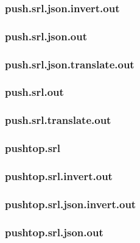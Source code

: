 \subsubsection{push.srl.json.invert.out}
\label{app:push_srl.json.invert.out}

\subsubsection{push.srl.json.out}
\label{app:push_srl.json.out}

\subsubsection{push.srl.json.translate.out}
\label{app:push_srl.json.translate.out}

\subsubsection{push.srl.out}
\label{app:push_srl.out}

\subsubsection{push.srl.translate.out}
\label{app:push_srl.translate.out}

\subsubsection{pushtop.srl}
\label{app:pushtop_srl}

\subsubsection{pushtop.srl.invert.out}
\label{app:pushtop_srl.invert.out}

\subsubsection{pushtop.srl.json.invert.out}
\label{app:pushtop_srl.json.invert.out}

\subsubsection{pushtop.srl.json.out}
\label{app:pushtop_srl.json.out}

